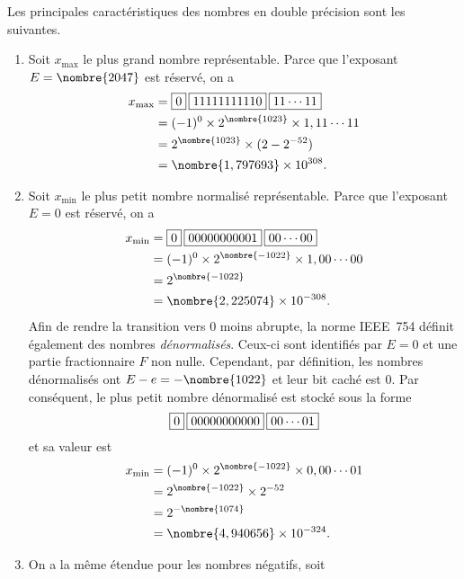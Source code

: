 \documentclass[letterpaper,11pt]{memoir}
\theoremstyle{plain}
\theoremstyle{definition}
\theoremstyle{remark}
\newcommand{\ieee}[3]{\fbox{$#1$}\hspace{2pt}\fbox{$#2$}\hspace{2pt}\fbox{$#3$}}
\begin{document}
Les principales caractéristiques des nombres en double précision sont
les suivantes.
\begin{enumerate}
\item Soit $x_{\text{max}}$ le plus grand nombre représentable. Parce
  que l'exposant $E = \nombre{2047}$ est réservé, on a
  \begin{align*}
    x_{\text{max}}
    &= \ieee{0}{11111111110}{11 \cdots 11} \\
    &= (-1)^0 \times 2^{\nombre{1023}} \times 1,11\cdots11 \\
    &= 2^{\nombre{1023}} \times (2 - 2^{-52}) \\
    &= \nombre{1,797693} \times 10^{308}.
  \end{align*}
\item Soit $x_{\text{min}}$ le plus petit nombre normalisé
  représentable. Parce que l'exposant $E = 0$ est réservé, on a
  \begin{align*}
    x_{\text{min}}
    &= \ieee{0}{00000000001}{00 \cdots 00} \\
    &= (-1)^0 \times 2^{\nombre{-1022}} \times 1,00\cdots00 \\
    &= 2^{\nombre{-1022}} \\
    &= \nombre{2,225074} \times 10^{-308}.
  \end{align*}
  Afin de rendre la transition vers $0$ moins abrupte, la norme
  IEEE~754 définit également des nombres \emph{dénormalisés}. Ceux-ci
  sont identifiés par $E = 0$ et une partie fractionnaire $F$ non
  nulle. Cependant, par définition, les nombres dénormalisés ont $E -
  e = -\nombre{1022}$ et leur bit caché est $0$. Par conséquent, le
  plus petit nombre dénormalisé est stocké sous la forme
  \begin{equation*}
    \ieee{0}{00000000000}{00 \cdots 01}
  \end{equation*}
  et sa valeur est
  \begin{align*}
    x_{\text{min}}
    &= (-1)^0 \times 2^{\nombre{-1022}} \times 0,00\cdots01 \\
    &= 2^{\nombre{-1022}} \times 2^{-52} \\
    &= 2^{-\nombre{1074}} \\
    &= \nombre{4,940656} \times 10^{-324}.
  \end{align*}
\item On a la même étendue pour les nombres négatifs, soit
  \begin{gather*}
    [\nombre{-1,797693} \times 10^{308},\,
     \nombre{-2,225074} \times 10^{-308}] \\

\end{gather*}
\end{enumerate}
\end{document}
